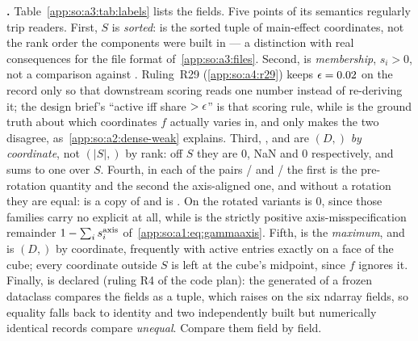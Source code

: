 \textbf{.} Table~\ref{app:so:a3:tab:labels} lists the fields.
Five points of its semantics regularly trip readers. First, $S$ is
\emph{sorted}:  is the sorted tuple of main-effect
coordinates, not the rank order the
components were built in --- a distinction with real consequences for the file
format of~\ref{app:so:a3:files}. Second,  is \emph{membership},
$s_i>0$, not a comparison against . Ruling~R29
(\ref{app:so:a4:r29}) keeps $\epsilon=0.02$ on the record only so
that downstream scoring reads one number instead of re-deriving it; the design
brief's ``active iff share
$>\epsilon$'' is that scoring rule, while  is the ground truth
about which coordinates $f$ actually varies in, and only 
makes the two disagree, as~\ref{app:so:a2:dense-weak} explains. Third,
,  and  are $(D,)$ \emph{by coordinate}, not
$(|S|,)$ by rank:
off $S$ they are $0$, NaN and $0$ respectively, and  sums to one over
$S$. Fourth, in each of the pairs / and
/ the first is the pre-rotation quantity and
the second the axis-aligned one, and without a rotation they are equal:
 is a copy of  and  is
. On the rotated variants  is $0$, since those
families carry no explicit  at all, while
 is the strictly positive axis-misspecification remainder
$1-\sum_is_{i}^{\mathrm{axis}}$ of~\eqref{app:so:a1:eq:gammaaxis}. Fifth, 
is the \emph{maximum}, and  is $(D,)$ by coordinate, frequently
with active entries exactly on a face of the cube; every coordinate outside $S$ is
left at the cube's midpoint, since $f$ ignores it. Finally,  is
declared  (ruling R4 of the code plan): the generated
 of a frozen dataclass compares the fields as a tuple, which
raises on the six ndarray fields, so equality falls back to identity and two
independently built but numerically identical records compare \emph{unequal}.
Compare them field by field.

\begin{table}[htbp]
  \centering
  \caption[The  record]{
  The  record: the ground truth a posterior is scored against.
  Generated from the  dataclass itself, so the field list cannot
  drift from the code. Shapes are given in terms of the ambient dimension $D$;
  the six array fields written $(D,)$ are indexed \emph{by coordinate}, which
  is what distinguishes them from the same-named, rank-ordered members of the
  npz (Table~\ref{app:so:a3:tab:npz}).  is recorded, never
  enforced.}\label{app:so:a3:tab:labels}
  \footnotesize\setlength{\tabcolsep}{3pt}
  
\end{table}

